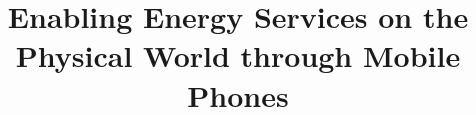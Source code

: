 \documentclass[10pt,print,letterpaper]{sigplan-proc-varsize}
\begin{document}

\title{Enabling Energy Services on the Physical World through Mobile Phones}



%
%
%
%
%
\end{document}
